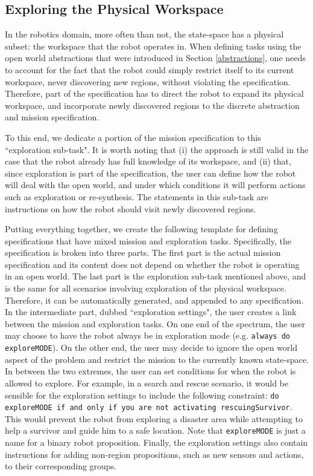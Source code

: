 \subsection{Exploring the Physical Workspace}

In the robotics domain, more often than not, the state-space has a physical subset: the workspace that the robot operates in. When defining tasks using the open world abstractions that were introduced in Section \ref{abstractions}, one needs to account for the fact that the robot could simply restrict itself to its current workspace, never discovering new regions, without violating the specification. Therefore, part of the specification has to direct the robot to expand its physical workspace, and incorporate newly discovered regions to the discrete abstraction and mission specification.

To this end, we dedicate a portion of the mission specification to this ``exploration sub-task". It is worth noting that (i) the approach is still valid in the case that the robot already has full knowledge of its workspace, and (ii) that, since exploration is part of the specification, the user can define how the robot will deal with the open world, and under which conditions it will perform actions such as exploration or re-synthesis. The statements in this sub-task are instructions on how the robot should visit newly discovered regions.

Putting everything together, we create the following template for defining specifications that have mixed mission and exploration tasks. Specifically, the specification is broken into three parts. The first part is the actual mission specification and its content does not depend on whether the robot is operating in an open world. The last part is the exploration sub-task mentioned above, and is the same for all scenarios involving exploration of the physical workspace. Therefore, it can be automatically generated, and appended to any specification. In the intermediate part, dubbed ``exploration settings", the user creates a link between the mission and exploration tasks. On one end of the spectrum, the user may choose to have the robot always be in exploration mode (e.g. \texttt{always do exploreMODE}). On the other end, the user may decide to ignore the open world aspect of the problem and restrict the mission to the currently known state-space. In between the two extremes, the user can set conditions for when the robot is allowed to explore. For example, in a search and rescue scenario, it would be sensible for the exploration settings to include the following constraint: \texttt{do exploreMODE if and only if you are not activating rescuingSurvivor}. This would prevent the robot from exploring a disaster area while attempting to help a survivor and guide him to a safe location. Note that \texttt{exploreMODE} is just a name for a binary robot proposition. Finally, the exploration settings also contain instructions for adding non-region propositions, such as new sensors and actions, to their corresponding groups.

